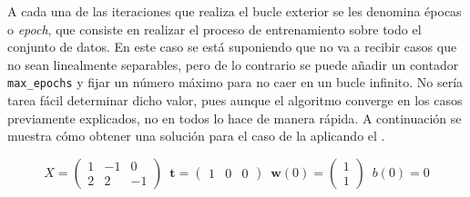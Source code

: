 		A cada una de las iteraciones que realiza el bucle exterior se les denomina épocas o \textit{epoch}, que consiste en realizar el proceso de entrenamiento sobre todo el conjunto de datos. En este caso se está suponiendo que no va a recibir casos que no sean linealmente separables, pero de lo contrario se puede añadir un contador \texttt{max\_epochs} y fijar un número máximo para no caer en un bucle infinito. No sería tarea fácil determinar dicho valor, pues aunque el algoritmo converge en los casos previamente explicados, no en todos lo hace de manera rápida. A continuación se muestra cómo obtener una solución para el caso de la  aplicando el . 
		
		$$
		X = \begin{pmatrix}
			1 & -1 & 0\\
			2 & 2 & -1
		\end{pmatrix} \,\,\, \textbf{t} = \begin{pmatrix}
		1 & 0 & 0
		\end{pmatrix} \,\,\, \textbf{w}(0) = \begin{pmatrix}
		1\\1 \end{pmatrix} \,\,\, b(0) = 0
		$$
		
